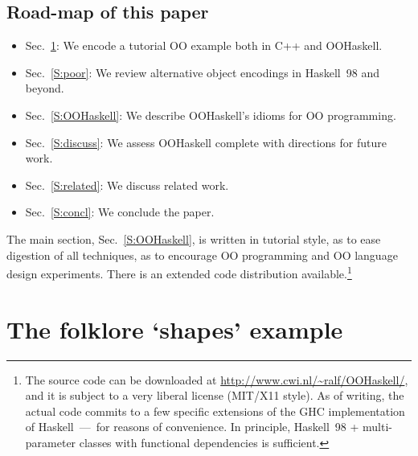 \documentclass{jfp}
\begin{document}

\newpage

\subsection*{Road-map of this paper}

\begin{itemize}
\item Sec.~\ref{S:shapes}: We encode a tutorial OO example both in C++ and OOHaskell.
\item Sec.~\ref{S:poor}: We review alternative object encodings in Haskell~98 and beyond.
\item Sec.~\ref{S:OOHaskell}: We describe OOHaskell's idioms for OO programming.
\item Sec.~\ref{S:discuss}: We assess OOHaskell complete with directions for future work.
\item Sec.~\ref{S:related}: We discuss related work.
\item Sec.~\ref{S:concl}: We conclude the paper.
\end{itemize}

\noindent
The main section, Sec.~\ref{S:OOHaskell}, is written in tutorial style,
as to ease digestion of all techniques, as to encourage OO programming
and OO language design experiments. There is an extended code
distribution available.\footnote{The source code can be downloaded at
\url{http://www.cwi.nl/~ralf/OOHaskell/}, and it is subject to 
a very liberal license (MIT/X11 style). As of writing, the actual code
commits to a few specific extensions of the GHC implementation of
Haskell~---~for reasons of convenience. In principle, Haskell~98 +
multi-parameter classes with functional dependencies is sufficient.}






\section{The folklore `shapes' example}
\label{S:shapes}
\end{document}
